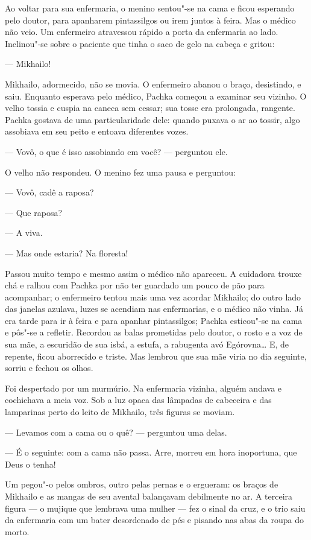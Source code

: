 Ao voltar para sua enfermaria, o menino sentou"-se na cama e ficou
esperando pelo doutor, para apanharem pintassilgos ou irem juntos à
feira. Mas o médico não veio. Um enfermeiro atravessou rápido a porta da
enfermaria ao lado. Inclinou"-se sobre o paciente que tinha o saco de
gelo na cabeça e gritou:

--- Mikhailo!

Mikhailo, adormecido, não se movia. O enfermeiro abanou o braço,
desistindo, e saiu. Enquanto esperava pelo médico, Pachka começou a
examinar seu vizinho. O velho tossia e cuspia na caneca sem cessar; sua
tosse era prolongada, rangente. Pachka gostava de uma particularidade
dele: quando puxava o ar ao tossir, algo assobiava em seu peito e
entoava diferentes vozes.

--- Vovô, o que é isso assobiando em você? --- perguntou ele.

O velho não respondeu. O menino fez uma pausa e perguntou:

--- Vovô, cadê a raposa?

--- Que raposa?

--- A viva.

--- Mas onde estaria? Na floresta!

Passou muito tempo e mesmo assim o médico não apareceu. A cuidadora
trouxe chá e ralhou com Pachka por não ter guardado um pouco
de pão para acompanhar; o enfermeiro tentou mais uma vez acordar
Mikhailo; do outro lado das janelas azulava, luzes se acendiam nas
enfermarias, e o médico não vinha. Já era tarde para ir à feira e para
apanhar pintassilgos; Pachka esticou"-se na cama e pôs"-se a refletir.
Recordou as balas prometidas pelo doutor, o rosto e a voz de sua mãe, a
escuridão de sua isbá, a estufa, a rabugenta avó Egórovna\ldots{} E, de
repente, ficou aborrecido e triste. Mas lembrou que sua mãe viria no dia
seguinte, sorriu e fechou os olhos.

Foi despertado por um murmúrio. Na enfermaria vizinha, alguém andava e
cochichava a meia voz. Sob a luz opaca das lâmpadas de cabeceira e das
lamparinas perto do leito de Mikhailo, três figuras se moviam.

--- Levamos com a cama ou o quê? --- perguntou uma delas.

--- É o seguinte: com a cama não passa. Arre, morreu em hora inoportuna,
que Deus o tenha!

Um pegou"-o pelos ombros, outro pelas pernas e o ergueram: os braços de
Mikhailo e as mangas de seu avental balançavam debilmente no ar. A
terceira figura --- o mujique que lembrava uma mulher --- fez o sinal da
cruz, e o trio saiu da enfermaria com um bater desordenado de pés e
pisando nas abas da roupa do morto.


